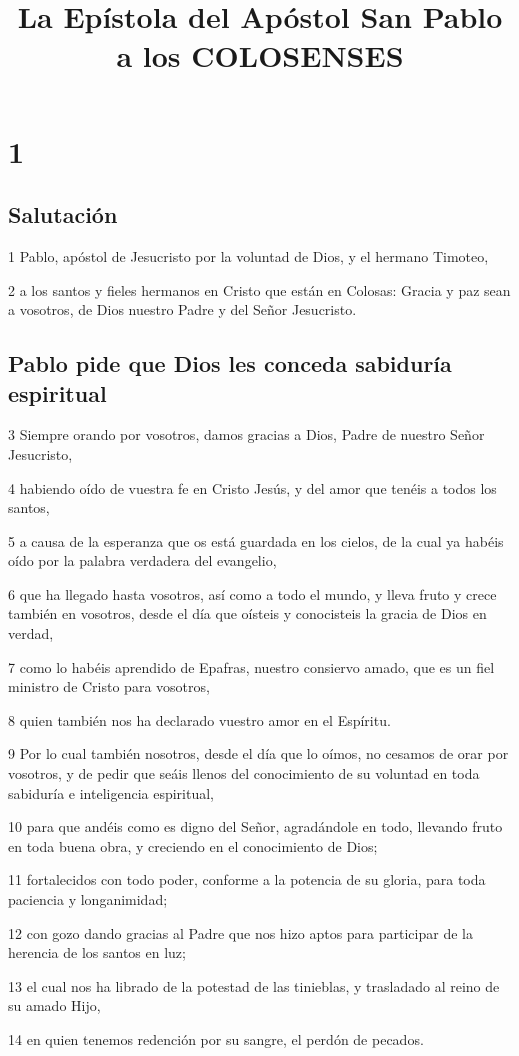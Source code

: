 
\title{La Epístola del Apóstol San Pablo a los COLOSENSES}

\chapter{1}

\section*{Salutación}

\par 1 Pablo, apóstol de Jesucristo por la voluntad de Dios, y el hermano Timoteo,
\par 2 a los santos y fieles hermanos en Cristo que están en Colosas: Gracia y paz sean a vosotros, de Dios nuestro Padre y del Señor Jesucristo.

\section*{Pablo pide que Dios les conceda sabiduría espiritual}

\par 3 Siempre orando por vosotros, damos gracias a Dios, Padre de nuestro Señor Jesucristo,
\par 4 habiendo oído de vuestra fe en Cristo Jesús, y del amor que tenéis a todos los santos,
\par 5 a causa de la esperanza que os está guardada en los cielos, de la cual ya habéis oído por la palabra verdadera del evangelio,
\par 6 que ha llegado hasta vosotros, así como a todo el mundo, y lleva fruto y crece también en vosotros, desde el día que oísteis y conocisteis la gracia de Dios en verdad,
\par 7 como lo habéis aprendido de Epafras, nuestro consiervo amado, que es un fiel ministro de Cristo para vosotros,
\par 8 quien también nos ha declarado vuestro amor en el Espíritu.
\par 9 Por lo cual también nosotros, desde el día que lo oímos, no cesamos de orar por vosotros, y de pedir que seáis llenos del conocimiento de su voluntad en toda sabiduría e inteligencia espiritual,
\par 10 para que andéis como es digno del Señor, agradándole en todo, llevando fruto en toda buena obra, y creciendo en el conocimiento de Dios;
\par 11 fortalecidos con todo poder, conforme a la potencia de su gloria, para toda paciencia y longanimidad;
\par 12 con gozo dando gracias al Padre que nos hizo aptos para participar de la herencia de los santos en luz;
\par 13 el cual nos ha librado de la potestad de las tinieblas, y trasladado al reino de su amado Hijo,
\par 14 en quien tenemos redención por su sangre, el perdón de pecados.

